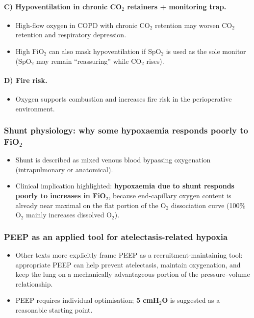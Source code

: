 \documentclass[11pt,a4paper]{article}
\begin{document}
\paragraph{C) Hypoventilation in chronic CO$_2$ retainers + monitoring trap.}
\begin{itemize}
  \item High-flow oxygen in COPD with chronic CO$_2$ retention may worsen CO$_2$ retention and respiratory depression.
  \item High FiO$_2$ can also mask hypoventilation if SpO$_2$ is used as the sole monitor (SpO$_2$ may remain ``reassuring'' while CO$_2$ rises).
\end{itemize}

\paragraph{D) Fire risk.}
\begin{itemize}
  \item Oxygen supports combustion and increases fire risk in the perioperative environment.
\end{itemize}

\subsubsection{Shunt physiology: why some hypoxaemia responds poorly to FiO$_2$}
\begin{itemize}
  \item Shunt is described as mixed venous blood bypassing oxygenation (intrapulmonary or anatomical).
  \item Clinical implication highlighted: \textbf{hypoxaemia due to shunt responds poorly to increases in FiO$_2$}, because end-capillary oxygen content is already near maximal on the flat portion of the O$_2$ dissociation curve (100\% O$_2$ mainly increases dissolved O$_2$).
\end{itemize}

\subsubsection{PEEP as an applied tool for atelectasis-related hypoxia}
\begin{itemize}
  \item Other texts more explicitly frame PEEP as a recruitment-maintaining tool: appropriate PEEP can help prevent atelectasis, maintain oxygenation, and keep the lung on a mechanically advantageous portion of the pressure--volume relationship.
  \item PEEP requires individual optimisation; \textbf{5 cmH$_2$O} is suggested as a reasonable starting point.
\end{itemize}
\end{document}
